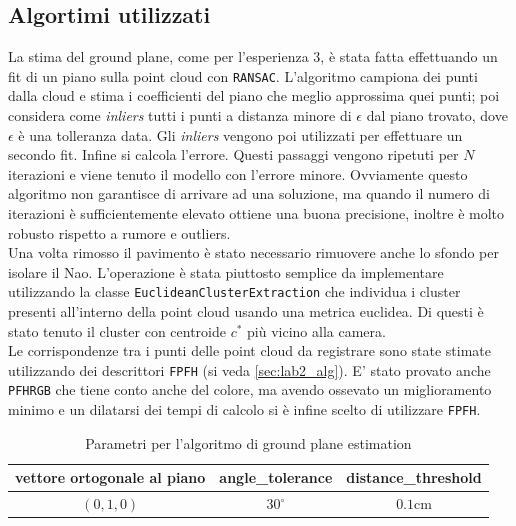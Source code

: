 \documentclass[a4paper]{article}
\begin{document}
	\subsection{Algortimi utilizzati} \label{sec:lab4_alg}
	La stima del ground plane, come per l'esperienza 3, è stata fatta effettuando un fit di un piano sulla point cloud con \verb|RANSAC|. L'algoritmo campiona dei punti dalla cloud e stima i coefficienti del piano che meglio approssima quei punti; poi considera come \textit{inliers} tutti i punti a distanza minore di $\epsilon$ dal piano trovato, dove $\epsilon$ è una tolleranza data. Gli \textit{inliers} vengono poi utilizzati per effettuare un secondo fit. Infine si calcola l'errore. Questi passaggi vengono ripetuti per $N$ iterazioni e viene tenuto il modello con l'errore minore. Ovviamente questo algoritmo non garantisce di arrivare ad una soluzione, ma quando il numero di iterazioni è sufficientemente elevato ottiene una buona precisione, inoltre è molto robusto rispetto a rumore e outliers. \\
	Una volta rimosso il pavimento è stato necessario rimuovere anche lo sfondo per isolare il Nao. L'operazione è stata piuttosto semplice da implementare utilizzando la classe \verb|EuclideanClusterExtraction| che individua i cluster presenti all'interno della point cloud usando una metrica euclidea. Di questi è stato tenuto il cluster con centroide $c^*$ più vicino alla camera. \\
	Le corrispondenze tra i punti delle point cloud da registrare sono state stimate utilizzando dei descrittori \verb|FPFH| (si veda \ref{sec:lab2_alg}). E' stato provato anche \verb|PFHRGB| che tiene conto anche del colore, ma avendo ossevato un miglioramento minimo e un dilatarsi dei tempi di calcolo si è infine scelto di utilizzare \verb|FPFH|.
	
	\begin{table}[]
		\centering
		\caption{Parametri per l'algoritmo di ground plane estimation}
		\label{tab:lab4_ground_plane}
		\begin{tabular}{|l|l|l|}
			\hline
			vettore ortogonale al piano     & angle\_tolerance         & distance\_threshold        \\ \hline
			\multicolumn{1}{|c|}{$(0, 1, 0)$} & \multicolumn{1}{c|}{$30^\circ$} & \multicolumn{1}{c|}{$0.1$cm} \\ \hline
		\end{tabular}
	\end{table}
	
\end{document}
